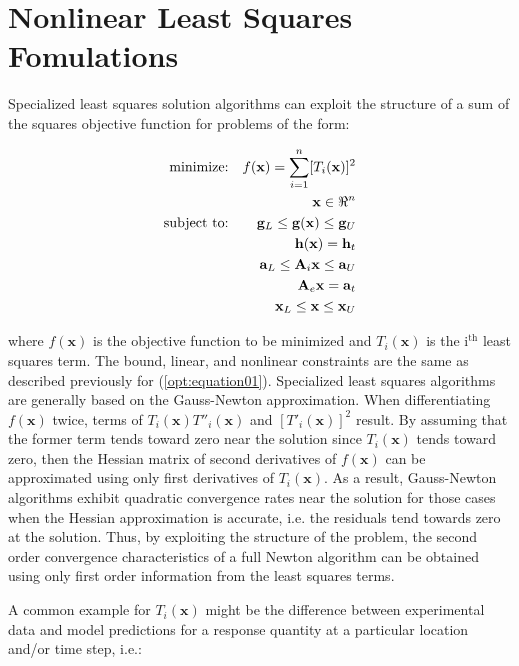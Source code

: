 \section{Nonlinear Least Squares Fomulations}\label{nls:formulations}

Specialized least squares solution algorithms can exploit the
structure of a sum of the squares objective function for problems of
the form:

\begin{eqnarray}
  \hbox{minimize:} & & f(\mathbf{x}) =
  \sum_{i=1}^{n}[T_i(\mathbf{x})]^2\nonumber\\
  & & \mathbf{x} \in \Re^{n}\nonumber\\
  \hbox{subject to:} & &
  \mathbf{g}_L \leq \mathbf{g(x)} \leq \mathbf{g}_U\nonumber\\
  & & \mathbf{h(x)}=\mathbf{h}_{t}\label{nls:equation02}\\
  & & \mathbf{a}_L \leq \mathbf{A}_i\mathbf{x} \leq
  \mathbf{a}_U\nonumber\\
  & & \mathbf{A}_e\mathbf{x}=\mathbf{a}_{t}\nonumber\\
  & & \mathbf{x}_L \leq \mathbf{x} \leq \mathbf{x}_U\nonumber
\end{eqnarray}

where $f(\mathbf{x})$ is the objective function to be minimized and
$T_i(\mathbf{x})$ is the i$^{\mathrm{th}}$ least squares term. The
bound, linear, and nonlinear constraints are the same as described
previously for (\ref{opt:equation01}).  Specialized least
squares algorithms are generally based on the Gauss-Newton
approximation. When differentiating $f(\mathbf{x})$ twice, terms of
$T_i(\mathbf{x})T''_i(\mathbf{x})$ and $[T'_i(\mathbf{x})]^{2}$
result. By assuming that the former term tends toward zero near the
solution since $T_i(\mathbf{x})$ tends toward zero, then the Hessian
matrix of second derivatives of $f(\mathbf{x})$ can be approximated
using only first derivatives of $T_i(\mathbf{x})$.  As a result,
Gauss-Newton algorithms exhibit quadratic convergence rates near the
solution for those cases when the Hessian approximation is accurate,
i.e. the residuals tend towards zero at the solution.  Thus, by
exploiting the structure of the problem, the second order convergence
characteristics of a full Newton algorithm can be obtained using only
first order information from the least squares terms.

A common example for $T_i(\mathbf{x})$ might be the difference
between experimental data and model predictions for a response
quantity at a particular location and/or time step, i.e.:

